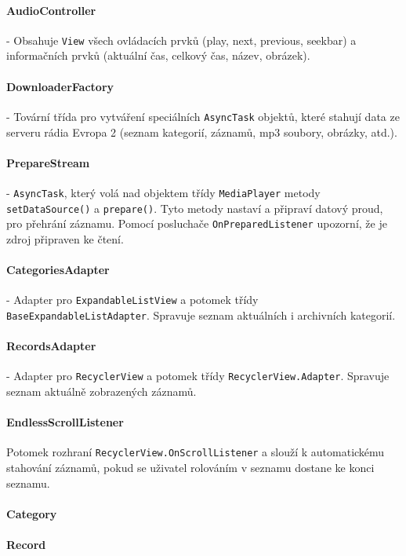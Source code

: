 \documentclass[12pt,a4paper,titlepage]{article}
\begin{document}
	\paragraph{AudioController}
	- Obsahuje \texttt{View} všech ovládacích prvků (play, next, previous, seekbar) a informačních prvků (aktuální čas, celkový čas, název, obrázek).
	\paragraph{DownloaderFactory}
	- Tovární třída pro vytváření speciálních \texttt{AsyncTask} objektů, které stahují data ze serveru rádia Evropa 2 (seznam kategorií, záznamů, mp3 soubory, obrázky, atd.).
	\paragraph{PrepareStream}
	- \texttt{AsyncTask}, který volá nad objektem třídy \texttt{MediaPlayer} metody \texttt{setDataSource()} a \texttt{prepare()}. Tyto metody nastaví a připraví datový proud, pro přehrání záznamu. Pomocí posluchače \texttt{OnPreparedListener} upozorní, že je zdroj připraven ke čtení.
	\paragraph{CategoriesAdapter}
	- Adapter pro \texttt{ExpandableListView} a potomek třídy \texttt{BaseExpandableListAdapter}. Spravuje seznam aktuálních i archivních kategorií.
	\paragraph{RecordsAdapter}
	- Adapter pro \texttt{RecyclerView} a potomek třídy \linebreak \texttt{RecyclerView.Adapter}. Spravuje seznam aktuálně zobrazených záznamů.
	\paragraph{EndlessScrollListener}
	Potomek rozhraní \texttt{RecyclerView.OnScrollListener} a slouží k automatickému stahování záznamů, pokud se uživatel rolováním v seznamu dostane ke konci seznamu.
	\paragraph{Category}
	
	\paragraph{Record}
\end{document}
